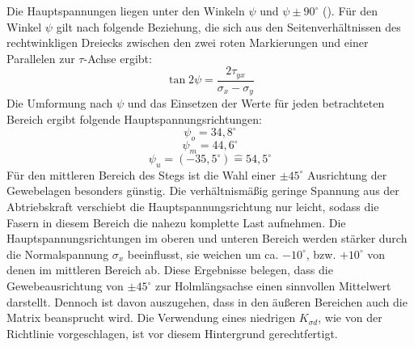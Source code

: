 Die Hauptspannungen liegen unter den Winkeln $ \psi $ und $ \psi \pm 90^{\circ} $ (\cite{item16}). Für den Winkel $ \psi $ gilt nach \cite{item16} folgende Beziehung, die sich aus den Seitenverhältnissen des rechtwinkligen Dreiecks zwischen den zwei roten Markierungen und einer Parallelen zur $ \tau $-Achse ergibt:
\begin{equation}
	\tan 2\psi=\frac{2\tau_{yx}}{\sigma_{x}-\sigma_{y}}
\end{equation}
Die Umformung nach $ \psi $ und das Einsetzen der Werte für jeden betrachteten Bereich ergibt folgende Hauptspannungsrichtungen:
\begin{equation}
	\psi_{o}=34,8^{\circ}
\end{equation}
\begin{equation}
	\psi_{m}=44,6^{\circ}
\end{equation}
\begin{equation}
	\psi_{u}=\left(-35,5^{\circ}\right)\hat{=}54,5^{\circ}
\end{equation}  
Für den mittleren Bereich des Stegs ist die Wahl einer $ \pm 45^{\circ} $ Ausrichtung der Gewebelagen besonders günstig. Die verhältnismäßig geringe Spannung aus der Abtriebskraft verschiebt die Hauptspannungsrichtung nur leicht, sodass die Fasern in diesem Bereich die nahezu komplette Last aufnehmen. Die Hauptspannungsrichtungen im oberen und unteren Bereich werden stärker durch die Normalspannung $ \sigma_{x} $ beeinflusst, sie weichen um ca. $ -10^{\circ} $, bzw. $ +10^{\circ} $ von denen im mittleren Bereich ab. Diese Ergebnisse belegen, dass die Gewebeausrichtung von $ \pm 45^{\circ} $ zur Holmlängsachse einen sinnvollen Mittelwert darstellt. Dennoch ist davon auszugehen, dass in den äußeren Bereichen auch die Matrix beansprucht wird. Die Verwendung eines niedrigen $ K_{\sigma d} $, wie von der Richtlinie vorgeschlagen, ist vor diesem Hintergrund gerechtfertigt.   